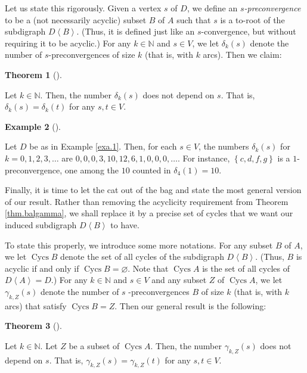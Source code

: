 \documentclass[numbers=enddot,12pt,final,onecolumn,notitlepage]{scrartcl}%
\theoremstyle{definition}
\newtheorem{theo}{Theorem}[section]
\newenvironment{theorem}[1][]
{\begin{theo}[#1]\begin{leftbar}}
{\end{leftbar}\end{theo}}
\newtheorem{exam}[theo]{Example}
\newenvironment{example}[1][]
{\begin{exam}[#1]\begin{leftbar}}
{\end{leftbar}\end{exam}}
\theoremstyle{plainsl}
\begin{document}
Let us state this rigorously. Given a vertex $s$ of $D$, we define an
\emph{$s$-preconvergence} to be a (not necessarily acyclic) subset $B$ of $A$
such that $s$ is a to-root of the subdigraph $D\left\langle B\right\rangle $.
(Thus, it is defined just like an $s$-convergence, but without requiring it to
be acyclic.) For any $k\in\mathbb{N}$ and $s\in V$, we let $\delta_{k}\left(
s\right)  $ denote the number of $s$-preconvergences of size $k$ (that is,
with $k$ arcs). Then we claim:

\begin{theorem}
\label{thm.baldelta}Let $k\in\mathbb{N}$. Then, the number $\delta_{k}\left(
s\right)  $ does not depend on $s$. That is, $\delta_{k}\left(  s\right)
=\delta_{k}\left(  t\right)  $ for any $s,t\in V$.
\end{theorem}

\begin{example}
\label{exa.1del}Let $D$ be as in Example \ref{exa.1}. Then, for each $s\in V$,
the numbers $\delta_{k}\left(  s\right)  $ for $k=0,1,2,3,\ldots$ are
$0,0,0,3,10,12,6,1,0,0,0,\ldots$. For instance, $\left\{  c,d,f,g\right\}  $
is a $1$-preconvergence, one among the $10$ counted in $\delta_{4}\left(
1\right)  =10$.
\end{example}

Finally, it is time to let the cat out of the bag and state the most general
version of our result. Rather than removing the acyclicity requirement from
Theorem \ref{thm.balgamma}, we shall replace it by a precise set of cycles
that we want our induced subdigraph $D\left\langle B\right\rangle $ to have.

To state this properly, we introduce some more notations. For any subset $B$
of $A$, we let $\operatorname*{Cycs}B$ denote the set of all cycles of the
subdigraph $D\left\langle B\right\rangle $. (Thus, $B$ is acyclic if and only
if $\operatorname*{Cycs}B=\varnothing$. Note that $\operatorname*{Cycs}A$ is
the set of all cycles of $D\left\langle A\right\rangle =D$.) For any
$k\in\mathbb{N}$ and $s\in V$ and any subset $Z$ of $\operatorname*{Cycs}A$,
we let $\gamma_{k,Z}\left(  s\right)  $ denote the number of $s$%
-preconvergences $B$ of size $k$ (that is, with $k$ arcs) that satisfy
$\operatorname*{Cycs}B=Z$. Then our general result is the following:

\begin{theorem}
\label{thm.gen}Let $k\in\mathbb{N}$. Let $Z$ be a subset of
$\operatorname*{Cycs}A$. Then, the number $\gamma_{k,Z}\left(  s\right)  $
does not depend on $s$. That is, $\gamma_{k,Z}\left(  s\right)  =\gamma
_{k,Z}\left(  t\right)  $ for any $s,t\in V$.
\end{theorem}
\end{document}
